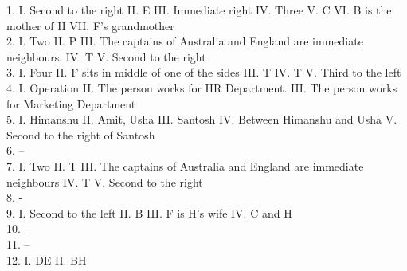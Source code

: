 \documentclass[
]{article}
\begin{document}
1. I. Second to the right \hspace{2mm}II. E \hspace{2mm}III. Immediate right \hspace{2mm}IV. Three \hspace{2mm}V. C \hspace{2mm}VI. B is the mother of H \hspace{2mm}VII. F’s grandmother\\
2. I. Two \hspace{2mm}II. P \hspace{2mm}III. The captains of Australia and England are immediate neighbours. \hspace{2mm}IV. T \hspace{2mm}V. Second to the right\\
3. I. Four \hspace{2mm}II. F sits in middle of one of the sides \hspace{2mm}III. T \hspace{2mm}IV. T \hspace{2mm}V. Third to the left\\
4. I. Operation \hspace{2mm}II. The person works for HR Department. \hspace{2mm}III. The person works for Marketing Department\\
5. I. Himanshu \hspace{2mm}II. Amit, Usha \hspace{2mm}III. Santosh \hspace{2mm}IV. Between Himanshu and Usha \hspace{2mm}V. Second to the right of Santosh\\
6. –\\
7. I. Two \hspace{2mm}II. T \hspace{2mm}III. The captains of Australia and England are immediate neighbours \hspace{2mm}IV. T \hspace{2mm}V. Second to the right\\
8. -\\
9. I. Second to the left \hspace{2mm}II. B \hspace{2mm}III. F is H's wife\hspace{2mm} IV. C and H\\
10. –\\
11. –\\
12. I. DE \hspace{2mm}II. BH\\
\end{document}
